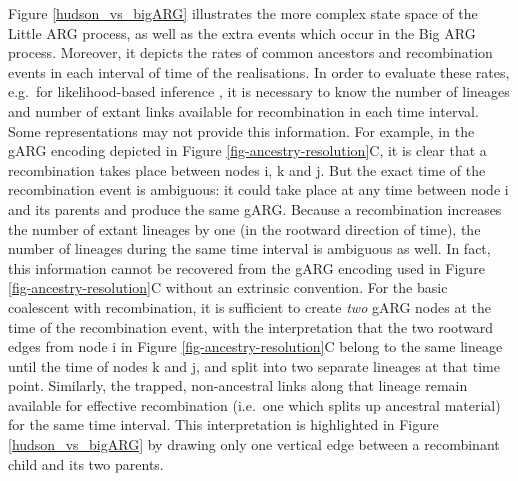 \documentclass[9pt,twocolumn,twoside]{gsajnl}
\newcommand{\noderef}[1]{\textsf{#1}}
\begin{document}
Figure \ref{hudson_vs_bigARG} illustrates the more complex state space
of the Little ARG process, as well as the extra events which occur in the Big ARG process.
Moreover, it depicts the rates of common ancestors and recombination events in each
interval of time of the realisations.
In order to evaluate these rates, e.g.\ for likelihood-based inference
\citep{baumdicker2021efficient, mahmoudi2022bayesian},
it is necessary to know the number of lineages and number of extant links
available for recombination in each time interval.
Some representations may not provide this information.
For example, in the gARG encoding depicted in Figure \ref{fig-ancestry-resolution}C,
it is clear that a recombination takes place between nodes \noderef{i}, \noderef{k} and \noderef{j}.
But the exact time of the recombination event is ambiguous: it could take place at any time between node \noderef{i} and its parents and produce the same gARG.
Because a recombination increases the number of extant lineages by one (in the rootward direction of time), the number of lineages during the same time interval is ambiguous as well.
In fact, this information cannot be recovered from the gARG encoding used in Figure \ref{fig-ancestry-resolution}C without an extrinsic convention.
For the basic coalescent with recombination,
it is sufficient to create \emph{two} gARG nodes at the time of the recombination event, with the interpretation that the two rootward edges from node \noderef{i} in Figure \ref{fig-ancestry-resolution}C belong to the same lineage until the time of nodes \noderef{k} and \noderef{j}, and split into two separate lineages at that time point.
Similarly, the trapped, non-ancestral links along that lineage remain available for effective recombination (i.e.\ one which splits up ancestral material) for the same time interval.
This interpretation is highlighted in
Figure \ref{hudson_vs_bigARG} by drawing only one vertical edge between a recombinant child and its two parents.


\end{document}
